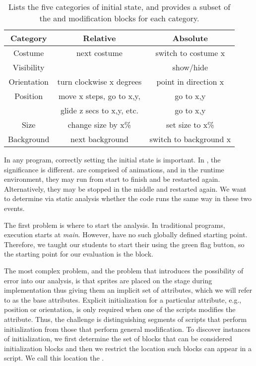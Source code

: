 \begin{table}
\centering
\begin{tabular}{|c|c|c|} \hline
Category & Relative&Absolute\\ \hline \hline
Costume& next costume & switch to costume x\\ \hline
Visibility& & show/hide\\ \hline
Orientation&turn clockwise x degrees&point in direction x\\ \hline
Position&move x steps, go to x,y,&go to x,y\\
&glide z secs to x,y, etc.&go to x,y\\ \hline
Size&change size by x\% & set size to x\%\\ \hline
Background&next background & switch to background x\\ \hline
\end{tabular}
\caption{Lists the five categories of initial state, and provides a subset of
  the \rel{} and \abs{} modification blocks for each category.}
\end{table}


In any program, correctly setting the initial state is important.  In
, the significance is different.   are comprised of
animations, and in the runtime environment, they may run from start to finish
and be restarted again.  Alternatively, they may be stopped in the middle and
restarted again.  We want to determine via static analysis whether the code
runs the same way in these two events.

The first problem is where to start the analysis.  In traditional programs,
execution starts at \emph{main}. However,  have no such globally
defined starting point. Therefore, we taught our students to start their
\sprogram{} using the green flag button, so the starting point for our
evaluation is the \greenflag{} block.

The most complex problem, and the problem that introduces the possibility of
error into our analysis, is that sprites are placed on the stage during
implementation thus giving them an implicit set of attributes, which we will
refer to as the base attributes. Explicit initialization for a particular
attribute, e.g., position or orientation, is only required when one of the
 scripts modifies the attribute. Thus, the challenge is
distinguishing segments of scripts that perform initialization from those that
perform general modification. To discover instances of initialization, we first
determine the set of blocks that can be considered initialization blocks and
then we restrict the location such blocks can appear in a script. We call this
location the \initzone{}.

